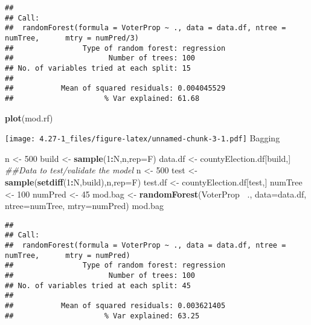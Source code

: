 \documentclass[]{article}
\newenvironment{Shaded}{\begin{snugshade}}{\end{snugshade}}
\newcommand{\CommentTok}[1]{\textcolor[rgb]{0.56,0.35,0.01}{\textit{#1}}}
\newcommand{\DataTypeTok}[1]{\textcolor[rgb]{0.13,0.29,0.53}{#1}}
\newcommand{\DecValTok}[1]{\textcolor[rgb]{0.00,0.00,0.81}{#1}}
\newcommand{\KeywordTok}[1]{\textcolor[rgb]{0.13,0.29,0.53}{\textbf{#1}}}
\newcommand{\NormalTok}[1]{#1}
\newcommand{\OperatorTok}[1]{\textcolor[rgb]{0.81,0.36,0.00}{\textbf{#1}}}
\newcommand{\StringTok}[1]{\textcolor[rgb]{0.31,0.60,0.02}{#1}}
\begin{document}
\begin{verbatim}
## 
## Call:
##  randomForest(formula = VoterProp ~ ., data = data.df, ntree = numTree,      mtry = numPred/3) 
##                Type of random forest: regression
##                      Number of trees: 100
## No. of variables tried at each split: 15
## 
##           Mean of squared residuals: 0.004045529
##                     % Var explained: 61.68
\end{verbatim}

\begin{Shaded}
\begin{Highlighting}[]
\KeywordTok{plot}\NormalTok{(mod.rf)}
\end{Highlighting}
\end{Shaded}

\texttt{[image: 4.27-1\_files/figure-latex/unnamed-chunk-3-1.pdf]}
Bagging

\begin{Shaded}
\begin{Highlighting}[]
\NormalTok{n <-}\StringTok{ }\DecValTok{500}
\NormalTok{build <-}\StringTok{ }\KeywordTok{sample}\NormalTok{(}\DecValTok{1}\OperatorTok{:}\NormalTok{N,n,}\DataTypeTok{rep=}\NormalTok{F)}
\NormalTok{data.df <-}\StringTok{ }\NormalTok{countyElection.df[build,]}
\CommentTok{##Data to test/validate the model}
\NormalTok{n <-}\StringTok{ }\DecValTok{500}
\NormalTok{test <-}\StringTok{ }\KeywordTok{sample}\NormalTok{(}\KeywordTok{setdiff}\NormalTok{(}\DecValTok{1}\OperatorTok{:}\NormalTok{N,build),n,}\DataTypeTok{rep=}\NormalTok{F)}
\NormalTok{test.df <-}\StringTok{ }\NormalTok{countyElection.df[test,]}
\NormalTok{numTree <-}\StringTok{ }\DecValTok{100}
\NormalTok{numPred <-}\StringTok{ }\DecValTok{45}
\NormalTok{mod.bag <-}\StringTok{ }\KeywordTok{randomForest}\NormalTok{(VoterProp }\OperatorTok{~}\NormalTok{.,}
                        \DataTypeTok{data=}\NormalTok{data.df, }
                        \DataTypeTok{ntree=}\NormalTok{numTree, }
                        \DataTypeTok{mtry=}\NormalTok{numPred)}
\NormalTok{mod.bag}
\end{Highlighting}
\end{Shaded}

\begin{verbatim}
## 
## Call:
##  randomForest(formula = VoterProp ~ ., data = data.df, ntree = numTree,      mtry = numPred) 
##                Type of random forest: regression
##                      Number of trees: 100
## No. of variables tried at each split: 45
## 
##           Mean of squared residuals: 0.003621405
##                     % Var explained: 63.25
\end{verbatim}
\end{document}

